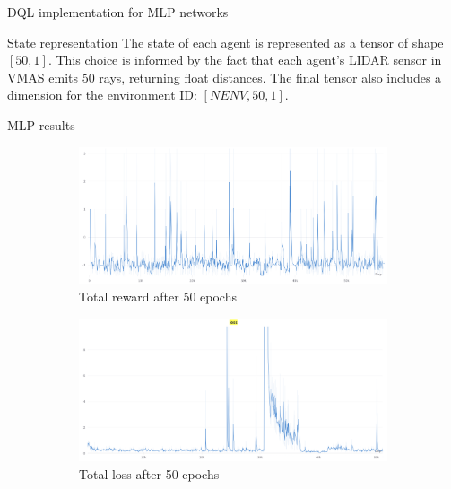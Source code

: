 \documentclass[presentation]{beamer}\mode<presentation>{\usetheme{AMSBolognaFC}}
\begin{document}
\begin{frame}{DQL implementation for MLP networks}
	\begin{block}{State representation}
		The state of each agent is represented as a tensor of shape $[50, 1]$.\newline
		This choice is informed by the fact that each agent’s LIDAR sensor in VMAS 
		emits 50 rays, returning float distances.\newline
		The final tensor also includes a dimension for the environment ID: $[N ENV, 50, 1]$.
	\end{block}
\end{frame}
\begin{frame}[allowframebreaks]{MLP results}
	\begin{figure}
		\centering
		\begin{subfigure}[b]{0.45\textwidth}
			\centering
			\includegraphics[width=\textwidth]{img/rewards_50_epochs.png}
			\caption{Total reward after 50 epochs}
			\label{fig:g}
		\end{subfigure}
		\hfill
		\begin{subfigure}[b]{0.45\textwidth}
			\centering
			\includegraphics[width=\textwidth]{img/loss_50_epochs.png}
			\caption{Total loss after 50 epochs}
			\label{fig:h}
		\end{subfigure}
		\hfill
		\begin{subfigure}[b]{0.45\textwidth}

\end{subfigure}
\end{figure}
\end{frame}
\end{document}
